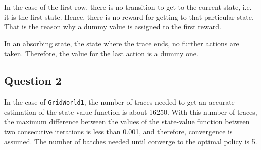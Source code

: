 \documentclass[11pt]{article}   	%
\begin{document}
In the case of the first row, there is no transition to get to the current state, i.e. it is the first state. Hence, there is no reward for getting to that particular state. That is the reason why a dummy value is assigned to the first reward.

In an absorbing state, the state where the trace ends, no further actions are taken. Therefore, the value for the last action is a dummy one.

\subsection*{Question 2}

In the case of \texttt{GridWorld1}, the number of traces needed to get an accurate estimation of the state-value function is about 16250. With this number of traces, the maximum difference between the values of the state-value function between two consecutive iterations is less than 0.001, and therefore, convergence is assumed. The number of batches needed until converge to the optimal policy is 5.
\end{document}
